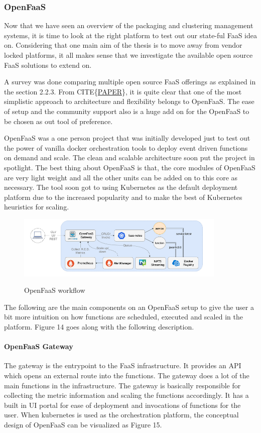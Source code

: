 \documentclass[12pt,titlepage]{article}
\begin{document}
\subsubsection{OpenFaaS}
\label{sec:org556c012}
Now that we have seen an overview of the packaging and clustering management
systems, it is time to look at the right platform to test out our state-ful FaaS
idea on. Considering that one main aim of the thesis is to move away from vendor
locked platforms, it all makes sense that we investigate the available open
source FaaS solutions to extend on.

A survey was done comparing multiple open source FaaS offerings as explained in
the section 2.2.3. From CITE\{\href{https://arxiv.org/pdf/1911.07449.pdf}{PAPER}\}, it is quite clear that one of the most
simplistic approach to architecture and flexibility belongs to OpenFaaS. The
ease of setup and the community support also is a huge add on for the OpenFaaS
to be chosen as out tool of preference.

OpenFaaS was a one person project that was initially developed just to test out
the power of vanilla docker orchestration tools to deploy event driven functions
on demand and scale. The clean and scalable architecture soon put the project in
spotlight. The best thing about OpenFaaS is that, the core modules of OpenFaaS
are very light weight and all the other units can be added on to this core as
necessary. The tool soon got to using Kubernetes as the default deployment
platform due to the increased popularity and to make the best of Kubernetes
heuristics for scaling.

\begin{figure}[!h]
    \caption{OpenFaaS workflow}
    \centering
    \includegraphics[width=100mm]{./thesis_images/openfaas_workflow.png}
    \label{fig:Openfaas workflow}
\end{figure}

The following are the main components on an OpenFaaS setup to give the user a
bit more intuition on how functions are scheduled, executed and scaled in the
platform. Figure 14 goes along with the following description.

\paragraph{OpenFaaS Gateway}
\label{sec:org761db87}
The gateway is the entrypoint to the FaaS infrastructure. It provides an API
which opens an external route into the functions. The gateway does a lot of the
main functions in the infrastructure. The gateway is basically responsible for
collecting the metric information and scaling the functions accordingly. It has
a built in UI portal for ease of deployment and invocations of functions for the
user. When kubernetes is used as the orchestration platform, the conceptual
design of OpenFaaS can be visualized as Figure 15.
\end{document}
